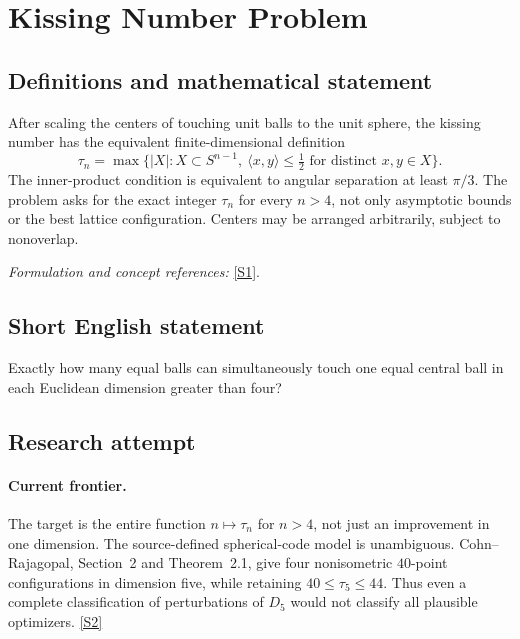 \documentclass[11pt,a4paper]{article}
\newcommand{\sref}[2]{\hyperlink{source:#1:#2}{[S#2]}}
\newif\ifshowcatalogue
\newcommand{\cataloguescope}[1]{\ifshowcatalogue
 \paragraph{Exact scope in the supplied catalogue.}
 \begin{quote}\small #1\end{quote}\fi}
\numberwithin{equation}{section}
\begin{document}
\setcounter{section}{0}
\clearpage
\section*{\texorpdfstring{Kissing Number Problem}{Kissing Number Problem}}\label{1369}
\subsection{Definitions and mathematical statement}
After scaling the centers of touching unit balls to the unit sphere, the kissing number has the equivalent finite-dimensional definition
\[
 \tau_n=\max\bigl\{|X|:X\subset S^{n-1},\ \langle x,y\rangle\le\tfrac12
                                  \text{ for distinct }x,y\in X\bigr\}.
\]
The inner-product condition is equivalent to angular separation at least $\pi/3$. The problem asks for the exact integer $\tau_n$ for every $n>4$, not only asymptotic bounds or the best lattice configuration. Centers may be arranged arbitrarily, subject to nonoverlap.
\par\smallskip\textit{Formulation and concept references:} \sref{1369}{1}.
\cataloguescope{For every integer n > 4, determine the exact kissing number tau\_n: the maximum number of pairwise nonoverlapping unit balls in Euclidean R\textasciicircum{}n that can touch a central unit ball of the same radius.}
\subsection{Short English statement}
Exactly how many equal balls can simultaneously touch one equal central ball in each Euclidean dimension greater than four?
\subsection{Research attempt}

\paragraph{Current frontier.}
The target is the entire function $n\mapsto\tau_n$ for $n>4$, not just
an improvement in one dimension. The source-defined spherical-code model
is unambiguous. Cohn--Rajagopal, Section~2 and Theorem~2.1, give four
nonisometric $40$-point configurations in dimension five, while retaining
$40\leq\tau_5\leq44$. Thus even a complete classification of perturbations
of $D_5$ would not classify all plausible optimizers. \sref{1369}{2}
\end{document}
